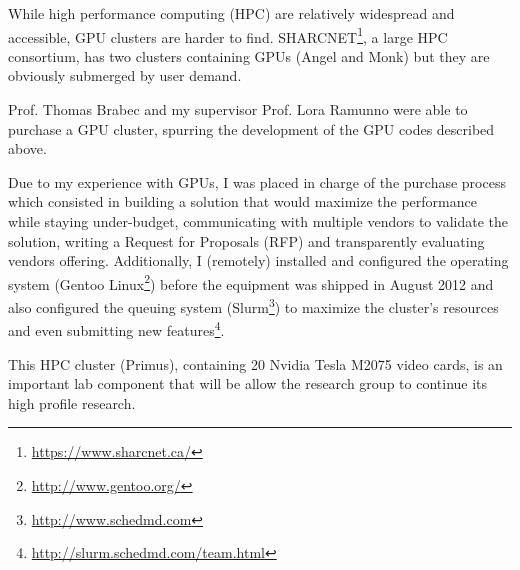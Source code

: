 
While high performance computing (HPC) are relatively widespread and accessible,
GPU clusters are harder to find.
SHARCNET\footnote{\url{https://www.sharcnet.ca/}}, a large HPC
consortium, has two clusters containing GPUs (Angel and Monk) but they are
obviously submerged by user demand.

Prof. Thomas Brabec and my supervisor Prof. Lora Ramunno were able to purchase
a GPU cluster, spurring the development of the GPU codes described above.

Due to my experience with GPUs, I was placed in charge of the purchase process
which consisted in building a solution that would maximize the performance
while staying under-budget, communicating with multiple vendors to validate
the solution, writing a Request for Proposals (RFP) and transparently evaluating
vendors offering. Additionally, I (remotely) installed and configured the
operating system (Gentoo Linux\footnote{\url{http://www.gentoo.org/}}) before
the equipment was shipped in August 2012 and also configured the queuing system
(Slurm\footnote{\url{http://www.schedmd.com}}) to maximize the cluster's
resources and even submitting new
features\footnote{\url{http://slurm.schedmd.com/team.html}}.

This HPC cluster (Primus), containing 20 Nvidia Tesla M2075 video cards, is an important
lab component that will be allow the research group to continue its high profile
research.



